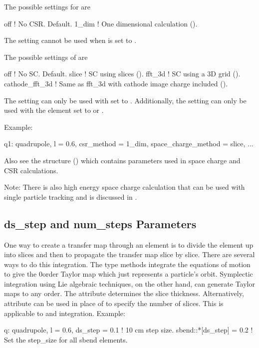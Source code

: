 The possible settings for  are
\begin{example}
  off             ! No CSR. Default.
  1_dim           ! One dimensional calculation ().
\end{example}
The  setting cannot be used when  is set to  .

The possible settings of  are
\begin{example}
  off             ! No SC. Default.
  slice           ! SC using slices ().
  fft_3d          ! SC using a 3D grid ().
  cathode_fft_3d  ! Same as fft_3d with cathode image charge included ().
\end{example}
The  setting can only be used with  set to . Additionally,
the  setting can only be used with the element  set to
 or .

Example:
\begin{example}
  q1: quadrupole, l = 0.6, csr_method = 1_dim, space_charge_method = slice, ...
\end{example}

Also see the  structure () which contains parameters used in
space charge and CSR calculations.

Note: There is also high energy space charge calculation that can be used with single particle
tracking and is discussed in .

\subsection{ds_step and num_steps Parameters}
\label{s:ds.step}

One way to create a transfer map through an element is to divide the element up into slices and then
to propagate the transfer map slice by slice.  There are several ways to do this integration. The
 type methods integrate the equations of motion to give the 0\Th order Taylor map
which just represents a particle's orbit.  Symplectic integration
using Lie algebraic techniques, on the other hand, can generate Taylor maps to any order. The
 attribute determines the slice thickness.  Alternatively,  attribute can
be used in place of  to specify the number of slices.  This is applicable to
 and  integration. Example:
\begin{example}
  q: quadrupole, l = 0.6, ds_step = 0.1  ! 10 cm step size.
  sbend::*[ds_step] = 0.2                ! Set the step_size for all sbend elements.
\end{example}

